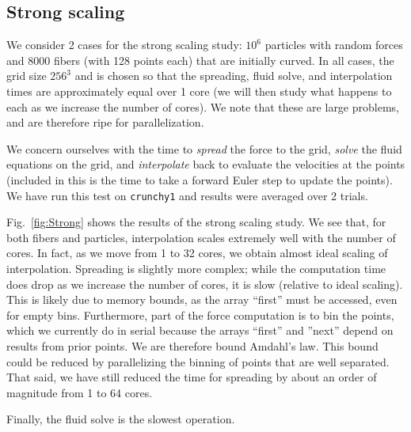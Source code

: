 \documentclass[]{article}
\begin{document}
\subsection{Strong scaling}
 We consider 2 cases for the strong scaling study: $10^6$ particles with random forces and 8000 fibers (with 128 points each) that are initially curved. In all cases, the grid size $256^3$ and is chosen so that the spreading, fluid solve, and interpolation times are approximately equal over 1 core (we will then study what happens to each as we increase the number of cores). We note that these are large problems, and are therefore ripe for parallelization. 

We concern ourselves with the time to \textit{spread} the force to the grid, \textit{solve} the fluid equations on the grid, and \textit{interpolate} back to evaluate the velocities at the points (included in this is the time to take a forward Euler step to update the points). We have run this test on \texttt{crunchy1} and results were averaged over 2 trials. 

Fig.\ \ref{fig:Strong} shows the results of the strong scaling study. We see that, for both fibers and particles, interpolation scales extremely well with the number of cores. In fact, as we move from 1 to 32 cores, we obtain almost ideal scaling of interpolation. Spreading is slightly more complex; while the computation time does drop as we increase the number of cores, it is slow (relative to ideal scaling). This is likely due to memory bounds, as the array ``first'' must be accessed, even for empty bins. Furthermore, part of the force computation is to bin the points, which we currently do in serial because the arrays ``first'' and ''next'' depend on results from prior points. We are therefore bound Amdahl's law. This bound could be reduced by parallelizing the binning of points that are well separated. That said, we have still reduced the time for spreading by about an order of magnitude from 1 to 64 cores. 

Finally, the fluid solve is the slowest operation. 
\end{document}
